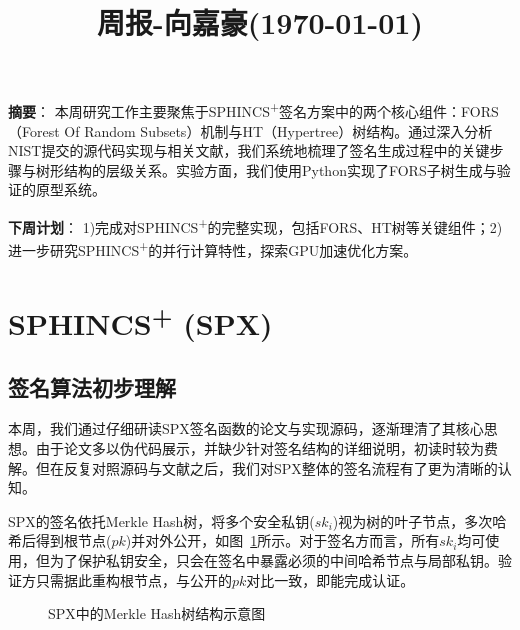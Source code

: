 \documentclass[11pt,a4paper]{article}
\title{周报-向嘉豪(\today)}
\renewcommand{\maketitle}{
  \begin{center}
    \LARGE\bfseries\thetitle
  \end{center}
}
\begin{document}
\maketitle

\noindent \textbf{摘要}：
本周研究工作主要聚焦于SPHINCS\textsuperscript{+}签名方案中的两个核心组件：FORS（Forest Of Random Subsets）机制与HT（Hypertree）树结构。通过深入分析NIST提交的源代码实现与相关文献，我们系统地梳理了签名生成过程中的关键步骤与树形结构的层级关系。实验方面，我们使用Python实现了FORS子树生成与验证的原型系统。

\vspace{1em}
\noindent \textbf{下周计划}： 1)完成对SPHINCS\textsuperscript{+}的完整实现，包括FORS、HT树等关键组件；2)进一步研究SPHINCS\textsuperscript{+}的并行计算特性，探索GPU加速优化方案。

\section{SPHINCS\textsuperscript{+} (SPX)}

\subsection{签名算法初步理解}
本周，我们通过仔细研读SPX签名函数的论文与实现源码，逐渐理清了其核心思想。由于论文多以伪代码展示，并缺少针对签名结构的详细说明，初读时较为费解。但在反复对照源码与文献之后，我们对SPX整体的签名流程有了更为清晰的认知。

SPX的签名依托Merkl\-e Hash树，将多个安全私钥($sk_i$)视为树的叶子节点，多次哈希后得到根节点($pk$)并对外公开，如图~\ref{fig:spx_sign}所示。对于签名方而言，所有$sk_i$均可使用，但为了保护私钥安全，只会在签名中暴露必须的中间哈希节点与局部私钥。验证方只需据此重构根节点，与公开的$pk$对比一致，即能完成认证。

\begin{figure}[htbp]
\centering
{}
\caption{SPX中的Merkle Hash树结构示意图}
\label{fig:spx_sign}
\end{figure}
\end{document}
